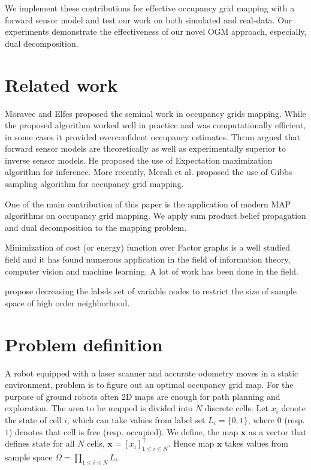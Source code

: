 \documentclass[letterpaper, 10 pt, conference]{ieeeconf} %
\newcommand{\vect}[1]{\mathbf{#1}}
\begin{document}
We implement these contributions for effective occupancy grid mapping with a 
forward sensor model and test our work on both simulated and real-data. Our 
experiments demonstrate the effectiveness of our novel OGM approach, especially, 
dual decomposition.  


\section{Related work} 
\label{sec:related}

Moravec and Elfes \cite{elfes1989using,moravec1988sensor,moravec1985high} proposed the
seminal work in occupancy grids mapping. While the proposed algorithm worked
well in practice and was computationally efficient, in some cases it provided
overconfident occupancy estimates. Thrun \cite{thrun2003learning} argued that
forward sensor models are theoretically as well as experimentally superior to 
inverse sensor models. He proposed the use of Expectation maximization
algorithm for inference. More recently, Merali et al. \cite{merali2013icra}
proposed the use of Gibbs sampling algorithm for occupancy grid mapping.

One of the main contribution of this paper is the application of modern MAP
algorithms on occupancy grid mapping. We apply sum product belief propagation
and dual decomposition to the mapping problem.

Minimization of cost (or energy) function over Factor graphs is a well studied
field and it has found numerous application in the field of information theory,
computer vision and machine learning. A lot of work has been done in the field.

\cite{leonardis2006efficient}  propose decreasing the labels set of variable
nodes to restrict the size of sample space of high order neighborhood. 

\section{Problem definition}
\newcommand{\map}{\vect{x}}
A robot equipped with a laser scanner and accurate odometry moves in a static
environment, problem is to figure out an optimal occupancy grid map. For the
purpose of ground robots often 2D maps are enough for path planning and
exploration.
The area to be mapped is divided into $N$ discrete cells. Let $x_i$ denote the state of cell $i$, which can take values from label set $L_i = \{0, 1\}$, where $0$ (resp. $1$) denotes that cell is free (resp. occupied). We define, the map $\map$ as a vector that defines state for all $N$ cells, $\map = [x_i]^\top_{1 \le i \le N}$. Hence map $\map$ takes values from sample space $\Omega = \prod_{1 \le i \le N}L_i$.
\end{document}
